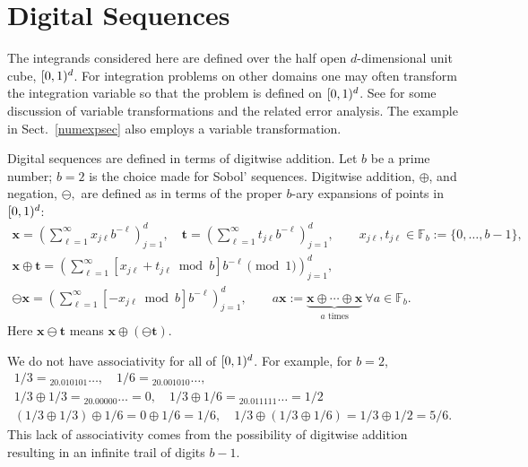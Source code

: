 \documentclass[graybox,footinfo]{svmult}
\newcommand{\F}{\mathbb{F}} %
\newcommand{\bst}{\boldsymbol{t}}    %
\newcommand{\bsx}{\boldsymbol{x}}    %
\begin{document}
\section{Digital Sequences}

The integrands considered here are defined over the half open $d$-dimensional unit cube, $[0,1)^d$.  For integration problems on other domains one may often transform the integration variable so that the problem is defined on $[0,1)^d$.  See \cite{Caf98,HicSloWas03c,HicSloWas03b,HicSloWas03a,HicSloWas03e} for some discussion of variable transformations and the related error analysis.  The example in Sect.\ \ref{numexpsec} also employs a variable transformation.

Digital sequences are defined in terms of digitwise addition.  Let $b$ be a prime number; $b=2$ is the choice made for Sobol' sequences.  Digitwise addition, $\oplus$, and negation, $\ominus,$ are defined as in terms of the proper $b$-ary expansions of points in $[0,1)^d$:
\begin{gather*}
\bsx = \left(\sum_{\ell=1}^{\infty} x_{j\ell} b^{-\ell}\right)_{j=1}^d, \quad \bst = \left(\sum_{\ell=1}^{\infty} t_{j\ell} b^{-\ell}\right)_{j=1}^d, \qquad x_{j\ell}, t_{j\ell} \in \F_b:=\{0, \ldots, b-1\}, \\
\bsx \oplus \bst = \left(\sum_{\ell=1}^{\infty} [x_{j\ell} + t_{j\ell} \bmod b] b^{-\ell} \pmod{1} \right)_{j=1}^d,\\
\ominus \bsx = \left(\sum_{\ell=1}^{\infty} [-x_{j\ell} \bmod b] b^{-\ell}\right)_{j=1}^d, \qquad a \bsx:=\underbrace{\bsx \oplus \cdots \oplus \bsx}_{a \text{ times}}\ \forall a \in \F_b.
\end{gather*}
Here $\bsx \ominus \bst$ means $\bsx \oplus (\ominus \bst)$.  

We do not have associativity for all of $[0,1)^d$.  For example, for $b=2$, 
\begin{gather*}
1/3={}_20.010101\ldots,\quad 1/6={}_20.001010\ldots, \\
1/3\oplus 1/3={}_20.00000\ldots =0, \quad 1/3\oplus1/6={}_20.011111\ldots=1/2\\
 (1/3\oplus1/3)\oplus1/6=0 \oplus 1/6 = 1/6, \quad 1/3\oplus(1/3\oplus1/6)=1/3 \oplus 1/2 = 5/6.
\end{gather*}
This lack of associativity comes from the possibility of digitwise addition resulting in an infinite trail of digits $b-1$.  
\end{document}
